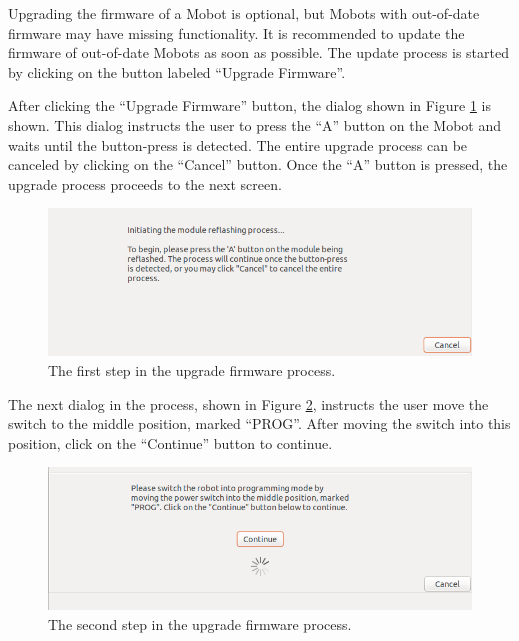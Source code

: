 \documentclass{article}
\begin{document}
Upgrading the firmware of a Mobot is optional, but Mobots with out-of-date firmware
may have missing functionality. It is recommended to update the firmware of
out-of-date Mobots as soon as possible. The update process is started by
clicking on the button labeled ``Upgrade Firmware''. 

After clicking the ``Upgrade Firmware'' button, the dialog shown in Figure
\ref{fig:update2} is shown. This dialog instructs the user to press the ``A''
button on the Mobot and waits until the button-press is detected. The 
entire upgrade process can be canceled by clicking on the ``Cancel'' button.
Once the ``A'' button is pressed, the upgrade process proceeds to the next screen.

\begin{figure}[H]
\begin{center}
\includegraphics[width=4.5in]{images/update2.png}
\end{center}
\caption{\label{fig:update2} The first step in the upgrade firmware process.}
\end{figure}

The next dialog in the process, shown in Figure \ref{fig:update3}, instructs
the user move the switch to the middle position, marked ``PROG''. After moving the
switch into this position, click on the ``Continue'' button to continue.

\begin{figure}[H]
\begin{center}
\includegraphics[width=4.5in]{images/reset3.png}
\end{center}
\caption{\label{fig:update3} The second step in the upgrade firmware process.}
\end{figure}
\end{document}
